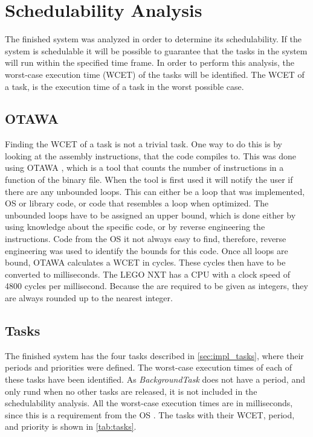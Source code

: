 \section{Schedulability Analysis}
The finished system was analyzed in order to determine its schedulability. If the system is schedulable it will be possible to guarantee that the tasks in the system will run within the specified time frame. In order to perform this analysis, the worst-case execution time (WCET) of the tasks will be identified. The WCET of a task, is the execution time of a task in the worst possible case.

\subsection{OTAWA}
Finding the WCET of a task is not a trivial task. One way to do this is by looking at the assembly instructions, that the code compiles to. This was done using OTAWA \cite{OTAWA}, which is a tool that counts the number of instructions in a function of the binary file. When the tool is first used it will notify the user if there are any unbounded loops. This can either be a loop that was implemented, OS or library code, or code that resembles a loop when optimized. The unbounded loops have to be assigned an upper bound, which is done either by using knowledge about the specific code, or by reverse engineering the instructions. Code from the OS it not always easy to find, therefore, reverse engineering was used to identify the bounds for this code. Once all loops are bound, OTAWA calculates a WCET in cycles. These cycles then have to be converted to milliseconds. The LEGO NXT has a CPU with a clock speed of 4800 cycles per millisecond. Because the  are required to be given as integers, they are always rounded up to the nearest integer.

\subsection{Tasks}
The finished system has the four tasks described in \cref{sec:impl_tasks}, where their periods and priorities were defined. The worst-case execution times of each of these tasks have been identified. As \emph{BackgroundTask} does not have a period, and only rund when no other tasks are released, it is not included in the schedulability analysis. All the worst-case execution times are in milliseconds, since this is a requirement from the OS \cite{scheduling1}. The tasks with their WCET, period, and priority is shown in \cref{tab:tasks}. 


